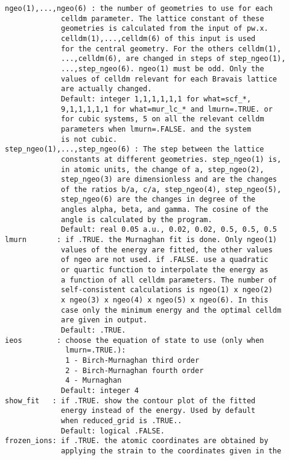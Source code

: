 \documentclass[12pt,a4paper,twoside]{report}
\begin{document}
\begin{verbatim}
ngeo(1),...,ngeo(6) : the number of geometries to use for each 
             celldm parameter. The lattice constant of these 
             geometries is calculated from the input of pw.x. 
             celldm(1),...,celldm(6) of this input is used 
             for the central geometry. For the others celldm(1),
             ...,celldm(6), are changed in steps of step_ngeo(1),
             ...,step_ngeo(6). ngeo(1) must be odd. Only the 
             values of celldm relevant for each Bravais lattice 
             are actually changed.
             Default: integer 1,1,1,1,1,1 for what=scf_*, 
             9,1,1,1,1,1 for what=mur_lc_* and lmurn=.TRUE. or 
             for cubic systems, 5 on all the relevant celldm 
             parameters when lmurn=.FALSE. and the system
             is not cubic.
step_ngeo(1),...,step_ngeo(6) : The step between the lattice 
             constants at different geometries. step_ngeo(1) is, 
             in atomic units, the change of a, step_ngeo(2), 
             step_ngeo(3) are dimensionless and are the changes 
             of the ratios b/a, c/a, step_ngeo(4), step_ngeo(5), 
             step_ngeo(6) are the changes in degree of the 
             angles alpha, beta, and gamma. The cosine of the 
             angle is calculated by the program.
             Default: real 0.05 a.u., 0.02, 0.02, 0.5, 0.5, 0.5
lmurn       : if .TRUE. the Murnaghan fit is done. Only ngeo(1) 
             values of the energy are fitted, the other values 
             of ngeo are not used. if .FALSE. use a quadratic 
             or quartic function to interpolate the energy as 
             a function of all celldm parameters. The number of 
             self-consistent calculations is ngeo(1) x ngeo(2) 
             x ngeo(3) x ngeo(4) x ngeo(5) x ngeo(6). In this 
             case only the minimum energy and the optimal celldm 
             are given in output. 
             Default: .TRUE. 
ieos        : choose the equation of state to use (only when 
              lmurn=.TRUE.):
              1 - Birch-Murnaghan third order
              2 - Birch-Murnaghan fourth order
              4 - Murnaghan
             Default: integer 4
show_fit   : if .TRUE. show the contour plot of the fitted 
             energy instead of the energy. Used by default 
             when reduced_grid is .TRUE..
             Default: logical .FALSE.
frozen_ions: if .TRUE. the atomic coordinates are obtained by 
             applying the strain to the coordinates given in the 

\end{verbatim}
\end{document}
